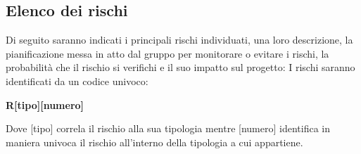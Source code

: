 \documentclass[../piano-di-progetto.tex]{subfiles}
\begin{document}
  \subsection{Elenco dei rischi}%
  \label{sub:elenco_dei_rischi}
  Di seguito saranno indicati i principali rischi individuati, una loro descrizione, la pianificazione messa in atto dal gruppo per monitorare o evitare i rischi, la probabilità che il rischio si verifichi e il suo impatto sul progetto:
  I rischi saranno identificati da un codice univoco:
  \begin{center}
    \textbf{R[tipo][numero]}
  \end{center}
  Dove [tipo] correla il rischio alla sua tipologia mentre [numero] identifica in maniera univoca il rischio all'interno della tipologia a cui appartiene.
      \renewcommand{\arraystretch}{2} %
\end{document}
